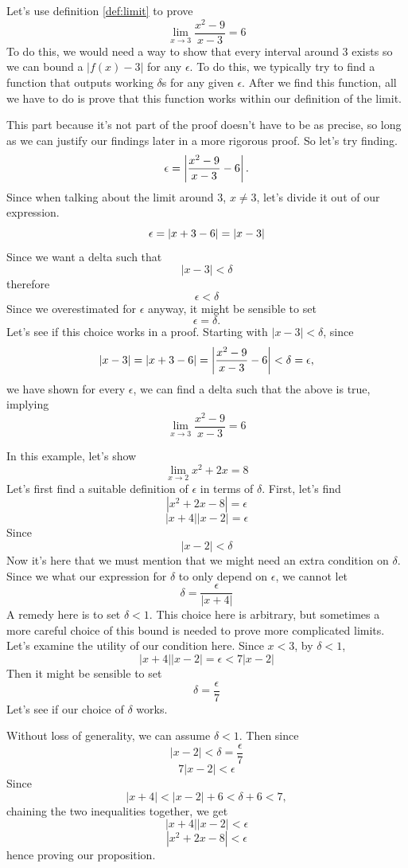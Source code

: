 \begin{ex}
	Let's use definition \eqref{def:limit} to prove
	$$\lim_{x\to3}\frac{x^2-9}{x-3}=6$$
	To do this, we would need a way to show that every interval around 3 exists so we can bound a $|f(x)-3|$ for any $\epsilon$. To do this, we typically try to find a function that outputs working $\delta$s for any given $\epsilon$. After we find this function, all we have to do is prove that this function works within our definition of the limit.
	
	This part because it's not part of the proof doesn't have to be as precise, so long as we can justify our findings later in a more rigorous proof. So let's try finding.
	$$\epsilon=\left\lvert \frac{x^2-9}{x-3}-6 \right\rvert.$$
	Since when talking about the limit around $3$, $x\neq3$, let's divide it out of our expression.
	$$\epsilon=\left\lvert x+3-6 \right\rvert=|x-3|$$
	Since we want a delta such that
	$$|x-3|<\delta$$
	therefore
	$$\epsilon<\delta$$
	Since we overestimated for $\epsilon$ anyway, it might be sensible to set
	$$\epsilon=\delta.$$
	Let's see if this choice works in a proof. Starting with $|x-3|<\delta$, since
	$$|x-3|=|x+3-6|=\left\lvert \frac{x^2-9}{x-3}-6 \right\rvert<\delta=\epsilon,$$
	we have shown for every $\epsilon$, we can find a delta such that the above is true, implying
	$$\lim_{x\to3}\frac{x^2-9}{x-3}=6$$
\end{ex}

\begin{ex}
	In this example, let's show
	$$\lim_{x\to2}x^2+2x=8$$
	Let's first find a suitable definition of $\epsilon$ in terms of $\delta$.
	First, let's find
	$$|x^2+2x-8|=\epsilon$$
	$$|x+4||x-2|=\epsilon$$
	Since
	$$|x-2|<\delta$$
	Now it's here that we must mention that we might need an extra condition on $\delta$.
	Since we what our expression for $\delta$ to only depend on $\epsilon$, we cannot let
	$$\delta=\frac{\epsilon}{|x+4|}$$
	A remedy here is to set $\delta<1$. This choice here is arbitrary, but sometimes a more careful choice of this bound is needed to prove more complicated limits.
	Let's examine the utility of our condition here. Since $x<3$, by $\delta<1$,
	$$|x+4||x-2|=\epsilon<7|x-2|$$
	Then it might be sensible to set
	$$\delta=\frac{\epsilon}{7}$$
	Let's see if our choice of $\delta$ works. 
	
	Without loss of generality, we can assume $\delta<1$. Then since
	$$|x-2|<\delta=\frac{\epsilon}{7}$$
	$$7|x-2|<\epsilon$$
	Since
	$$|x+4|<|x-2|+6<\delta+6<7,$$
	chaining the two inequalities together, we get
	$$|x+4||x-2|<\epsilon$$
	$$|x^2+2x-8|<\epsilon$$
	hence proving our proposition.
\end{ex}

